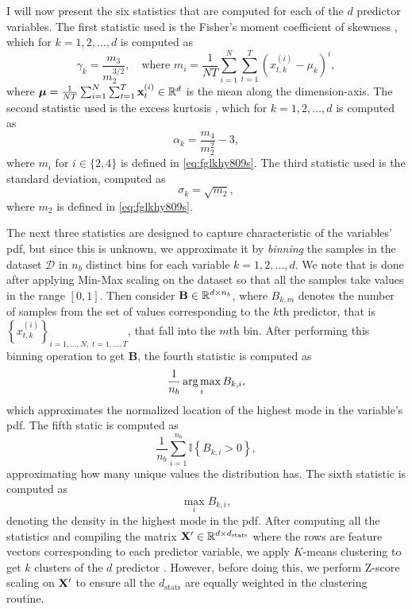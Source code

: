 \documentclass{statsmsc}
\begin{document}
{%
I will now present the six statistics that are computed
for each of the $d$ predictor variables.
The first statistic used is the Fisher's moment
coefficient of skewness \citep{shape}, which for $k=1,2,\dots,d$ is computed as
\begin{equation}\label{eq:fglkhy809s}
    \gamma_k=\frac{m_3}{m_2^{3/2}}, \quad \textrm{where }
    m_i=  \frac{1}{NT} \sum^{N}_{i=1} \sum^{T}_{t=1} \left(x^{(i)}_{t,k}-\mu_k \right)^i,
\end{equation}
where $\bm{\mu}=\frac{1}{NT}\sum^{N}_{i=1} \sum^{T}_{t=1} \mathbf{x}^{(i)}_t \in \mathbb{R}^d$ is the mean along the dimension-axis.
The second statistic used is the excess kurtosis \citep{shape}, which for $k=1,2,\dots,d$ is computed as
\begin{equation}
    \alpha_k=\frac{m_4}{m_2^2}-3,
\end{equation}
where $m_i$ for $i\in \{2,4\}$ is defined in  \cref{eq:fglkhy809s}.
The third statistic used is the standard deviation, computed as
\begin{equation}
    \sigma_k=\sqrt{m_2},
\end{equation}
where $m_2$ is defined in \cref{eq:fglkhy809s}.

The next three statistics are designed to capture characteristic of the variables' \ac{pdf}, but
since this is unknown, we approximate it by \textit{binning} the samples in the dataset
$\mathcal{D}$ in $n_{{b}}$ distinct bins for each variable $k=1,2,\dots,d$.
We note that is done after applying Min-Max scaling on the dataset so that all the samples take
values in the range $[0,1]$.
Then consider $\mathbf{B} \in \mathbb{R}^{d \times n_b}$,
where $B_{k,m}$ denotes the number of samples from the set of values corresponding to the
$k$th predictor, that is $\left\{x_{t,k}^{(i)} \right\}_{i=1,\dots,N,\;t=1,\dots,T}$,
that fall into the $m$th bin.
After performing this binning operation to get $\mathbf{B}$, the fourth statistic is computed as
\begin{equation}
    \frac{1}{n_{b}}  \operatorname*{arg\,max}_{i} B_{k,i},
\end{equation}
which approximates the normalized location of the highest mode in the variable's \ac{pdf}.
The fifth static is computed as
\begin{equation}
    \frac{1}{n_{b }}  \sum^{n_{b }}_{i=1} \mathbb{I}\left\{
        B_{k,i} > 0
    \right\},
\end{equation}
approximating how many unique values the distribution has. The sixth statistic is computed as
\begin{equation}
     \max_{i} B_{k,i},
\end{equation}
denoting the density in the highest mode in the \ac{pdf}.
After computing all the statistics and compiling the matrix
$\mathbf{X}' \in \mathbb{R}^{d \times d_{\textrm{stats} }}$ where the rows are feature vectors corresponding
to each predictor variable, we apply $K$-means clustering to get $k$ clusters
of the $d$ predictor \citep{kmeans}. However, before doing this, we perform Z-score scaling
on $\mathbf{X}'$ to ensure all the $d_{\textrm{stats}}$ are equally weighted in the clustering
routine.

}
\end{document}
